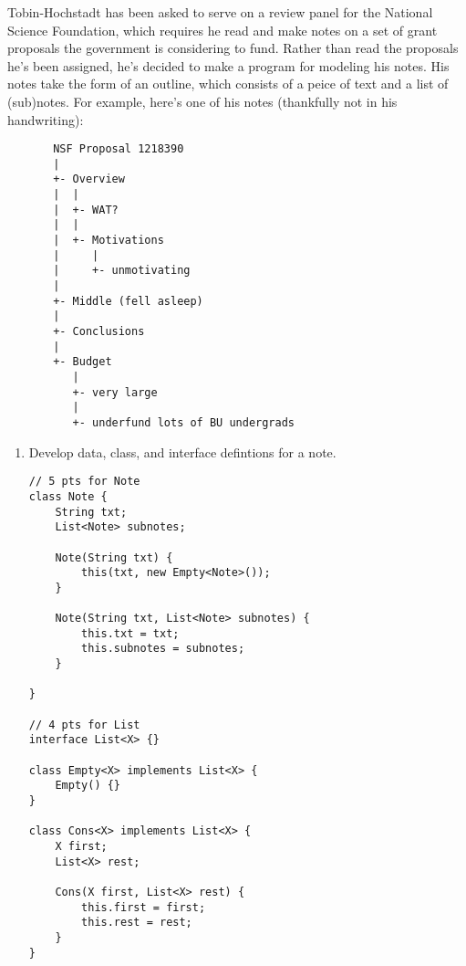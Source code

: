\documentclass[12pt]{article}                   %
\def\pts#1{\marginpar{\footnotesize \raggedright  \fbox{#1 {\sc Points}}}}
\newenvironment{solution}{\color{Red}}{}
\begin{document}
\ifrubric
\else
{}
\fi
\newpage


\begin{problem} \pts{25}
\noindent
Tobin-Hochstadt has been asked to serve on a review panel for the
 National Science Foundation, which requires he read and make notes on
 a set of grant proposals the government is considering to fund.
  Rather than read the proposals he's been assigned, he's decided to
 make a program for modeling his notes.  His notes take the form of an
 outline, which consists of a peice of text and a list of (sub)notes.
  For example, here's one of his notes (thankfully not in his
 handwriting):
\begin{verbatim}
       NSF Proposal 1218390
       |
       +- Overview
       |  |
       |  +- WAT?
       |  |
       |  +- Motivations
       |     |
       |     +- unmotivating
       |
       +- Middle (fell asleep)
       |
       +- Conclusions
       |
       +- Budget
          |
          +- very large
          |
          +- underfund lots of BU undergrads
\end{verbatim}


\newpage

\begin{enumerate}

\item Develop data, class, and interface defintions for a note.

\begin{solution}
\begin{verbatim}
// 5 pts for Note
class Note {
    String txt;
    List<Note> subnotes;
    
    Note(String txt) {
        this(txt, new Empty<Note>());
    }

    Note(String txt, List<Note> subnotes) {
        this.txt = txt;
        this.subnotes = subnotes;
    }

}

// 4 pts for List
interface List<X> {}

class Empty<X> implements List<X> {
    Empty() {}
}

class Cons<X> implements List<X> {
    X first;
    List<X> rest;

    Cons(X first, List<X> rest) {
        this.first = first;
        this.rest = rest;
    }
}

\end{verbatim}
\end{solution}


\end{enumerate}
\end{problem}
\end{document}
